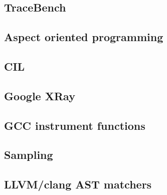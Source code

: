 \subsection{TraceBench}
\subsection{Aspect oriented programming}
\subsection{CIL}
\subsection{Google XRay}
\subsection{GCC instrument functions}
\subsection{Sampling}
\subsection{LLVM/clang AST matchers}
